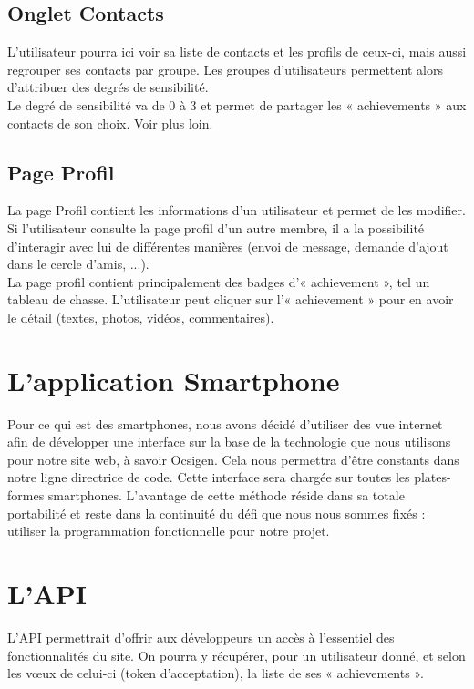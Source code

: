 \documentclass{life-fr}
\begin{document}
\subsection{Onglet Contacts}

L'utilisateur pourra ici voir sa liste de contacts et les profils de ceux-ci, mais aussi regrouper ses contacts par groupe. Les groupes d'utilisateurs permettent alors d'attribuer des degrés de sensibilité.\\
Le degré de sensibilité va de 0 à 3 et permet de partager les « achievements » aux contacts de son choix. Voir plus loin.

\subsection{Page Profil}

La page Profil contient les informations d'un utilisateur et permet de les modifier. Si l'utilisateur consulte la page profil d'un autre membre, il a la possibilité d'interagir avec lui de différentes manières (envoi de message, demande d'ajout dans le cercle d'amis, ...).\\
La page profil contient principalement des badges d'« achievement », tel un tableau de chasse. L'utilisateur peut cliquer sur l'« achievement » pour en avoir le détail (textes, photos, vidéos, commentaires).

\section{L'application Smartphone}

Pour ce qui est des smartphones, nous avons décidé d'utiliser des vue internet afin de développer une interface sur la base de la technologie que nous utilisons pour notre site web, à savoir Ocsigen. Cela nous permettra d'être constants dans notre ligne directrice de code. Cette interface sera chargée sur toutes les plates-formes smartphones. L'avantage de cette méthode réside dans sa totale portabilité et reste dans la continuité du défi que nous nous sommes fixés : utiliser la programmation fonctionnelle pour notre projet.

\section{L'API}

L'API permettrait d'offrir aux développeurs un accès à l'essentiel des fonctionnalités du site. On pourra y récupérer, pour un utilisateur donné, et selon les vœux de celui-ci (token d'acceptation), la liste de ses « achievements ».
\end{document}
